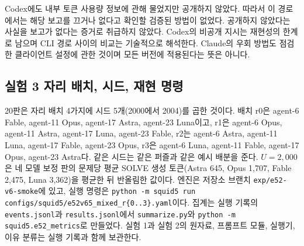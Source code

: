 Codex에도 내부 토큰 사용량 정보에 관해 물었지만 공개하지 않았다. 따라서 이 경로에서는 해당 보고를 끄거나 없다고 확인할 검증된 방법이 없었다. 공개하지 않았다는 사실을 보고가 없다는 증거로 취급하지 않았다. Codex의 비공개 지시는 재현성의 한계로 남으며 CLI 경로 사이의 비교는 기술적으로 해석한다. Claude의 우회 방법도 점검한 클라이언트 설정에 관한 것이며 모든 버전에 적용된다는 뜻은 아니다.

\subsection{실험 3 자리 배치, 시드, 재현 명령}\label{app:arena-repro}
20판은 자리 배치 4가지에 시드 5개(2000에서 2004)를 곱한 것이다. 배치 r0은 agent-6 Fable, agent-11 Opus, agent-17 Astra, agent-23 Luna이고, r1은 agent-6 Opus, agent-11 Astra, agent-17 Luna, agent-23 Fable, r2는 agent-6 Astra, agent-11 Luna, agent-17 Fable, agent-23 Opus, r3은 agent-6 Luna, agent-11 Fable, agent-17 Opus, agent-23 Astra다. 같은 시드는 같은 퍼즐과 같은 예시 배분을 준다. $U=2{,}000$은 네 모델 보정 판의 문제당 평균 SOLVE 생성 토큰(Astra 645, Opus 1,707, Fable 2,475, Luna 3,362)을 평균한 뒤 반올림한 값이다. 엔진은 저장소 브랜치 \texttt{exp/e52-v6-smoke}에 있고, 실행 명령은 \texttt{python -m squid5 run} \texttt{configs/squid5/}\allowbreak\texttt{e52v65\_mixed\_r\{0..3\}.yaml}이다. 집계는 실행 기록의 \texttt{events.jsonl}과 \texttt{results.jsonl}에서 \texttt{summarize.py}와 \texttt{python -m squid5.e52\_metrics}로 만들었다. 실험 1과 실험 2의 원자료, 프롬프트 모듈, 실행기, 이유 분류는 실행 기록과 함께 보관한다.

